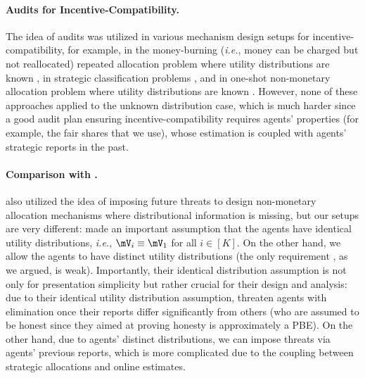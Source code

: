 \paragraph{Audits for Incentive-Compatibility.}
The idea of audits was utilized in various mechanism design setups for incentive-compatibility, for example, in the money-burning (\textit{i.e.}, money can be charged but not reallocated) repeated allocation problem where utility distributions are known \citep{lundy2019allocation}, in strategic classification problems \citep{estornell2021incentivizing,estornell2023incentivizing}, and in one-shot non-monetary allocation problem where utility distributions are known \citep{jalota2024catch}. However, none of these approaches applied to the unknown distribution case, which is much harder since a good audit plan ensuring incentive-compatibility requires agents' properties (for example, the fair shares that we use), whose estimation is coupled with agents' strategic reports in the past.

\paragraph{Comparison with \citep{yin2022online}.}
\citet{yin2022online} also utilized the idea of imposing future threats to design non-monetary allocation mechanisms where distributional information is missing, but our setups are very different:
\citet{yin2022online} made an important assumption that the agents have identical utility distributions, \textit{i.e.}, $\mV_i\equiv \mV_1$ for all $i\in [K]$. On the other hand, we allow the agents to have distinct utility distributions (the only requirement , as we argued, is weak). 
Importantly, their identical distribution assumption is not only for presentation simplicity but rather crucial for their design and analysis: due to their identical utility distribution assumption, \citet{yin2022online} threaten agents with elimination once their reports differ significantly from others (who are assumed to be honest since they aimed at proving honesty is approximately a PBE). On the other hand, due to agents' distinct distributions, we can impose threats via agents' previous reports, which is more complicated due to the coupling between strategic allocations and online estimates.